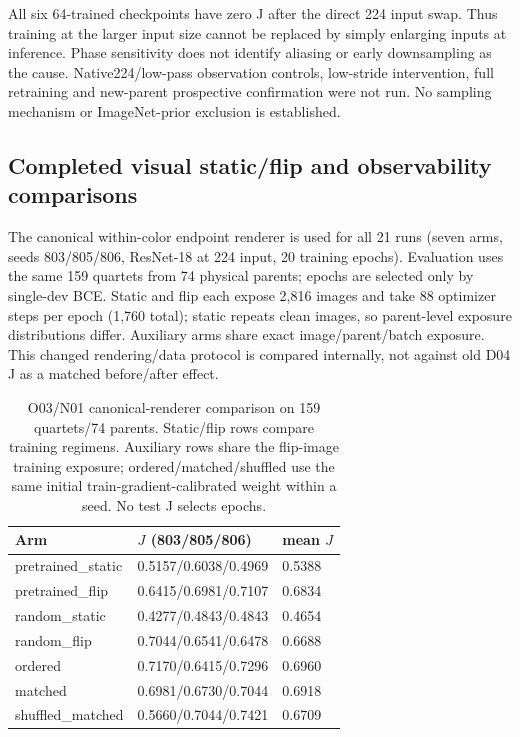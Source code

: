 All six 64-trained checkpoints have zero J after the direct 224 input swap. Thus training at the larger input size cannot be replaced by simply enlarging inputs at inference. Phase sensitivity does not identify aliasing or early downsampling as the cause. Native224/low-pass observation controls, low-stride intervention, full retraining and new-parent prospective confirmation were not run. No sampling mechanism or ImageNet-prior exclusion is established.
\subsection{Completed visual static/flip and observability comparisons}
The canonical within-color endpoint renderer is used for all 21 runs (seven arms, seeds 803/805/806, ResNet-18 at 224 input, 20 training epochs). Evaluation uses the same 159 quartets from 74 physical parents; epochs are selected only by single-dev BCE. Static and flip each expose 2,816 images and take 88 optimizer steps per epoch (1,760 total); static repeats clean images, so parent-level exposure distributions differ. Auxiliary arms share exact image/parent/batch exposure. This changed rendering/data protocol is compared internally, not against old D04 J as a matched before/after effect.
\begin{table}[t]\centering\small\begin{tabular}{@{}lll@{}}\toprule
Arm & $J$ (803/805/806) & mean $J$ \\
\midrule
pretrained\_static & 0.5157/0.6038/0.4969 & 0.5388 \\
pretrained\_flip & 0.6415/0.6981/0.7107 & 0.6834 \\
random\_static & 0.4277/0.4843/0.4843 & 0.4654 \\
random\_flip & 0.7044/0.6541/0.6478 & 0.6688 \\
ordered & 0.7170/0.6415/0.7296 & 0.6960 \\
matched & 0.6981/0.6730/0.7044 & 0.6918 \\
shuffled\_matched & 0.5660/0.7044/0.7421 & 0.6709 \\
\bottomrule\end{tabular}\caption{O03/N01 canonical-renderer comparison on 159 quartets/74 parents. Static/flip rows compare training regimens. Auxiliary rows share the flip-image training exposure; ordered/matched/shuffled use the same initial train-gradient-calibrated weight within a seed. No test J selects epochs.}\end{table}
